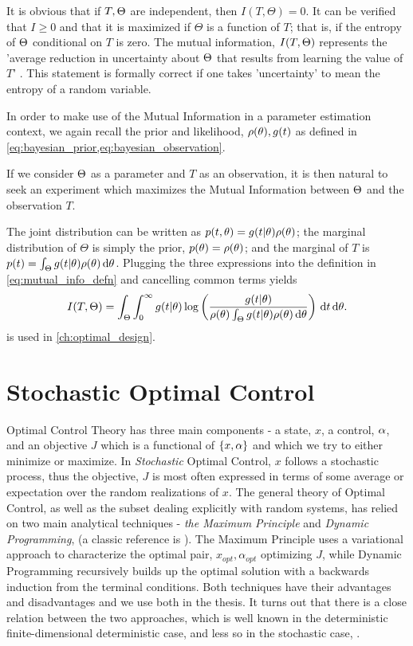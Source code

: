 It is obvious that if $T,{\Theta}$ are independent, then $I(T,\Theta) = 0$. It can
be verified that $I\geq0$ and that it is maximized if $\Theta$ is a function of
$T$; that is, if the entropy of ${\Theta}$ conditional on $T$ is zero. 
The mutual information, $I(T,{\Theta})$ represents the 'average
reduction in uncertainty about ${\Theta}$ that results from learning the value of
$T$' \cite{MacKay2003}. This statement is formally correct if one takes
 'uncertainty' to mean the entropy of a random
 variable.
 
In order to make use of the Mutual Information in a parameter estimation
context, we again recall the prior and likelihood, $\rho({ \theta}), g(t)$ as defined
in \cref{eq:bayesian_prior,eq:bayesian_observation}.

If we consider ${\Theta}$ as a parameter and $T$ as an observation, it is then
natural to seek an experiment which maximizes the Mutual Information between
${\Theta}$ and the observation $T$.
 
 The joint distribution can be written as $p(t,{ \theta}) =
g(t|{ \theta})\rho({ \theta})$; the marginal distribution of $\Theta$ is simply the prior, $p({ \theta}) =
\rho({ \theta})$; and the marginal of $T$ is $p(t) =
\int_\Theta g(t|{ \theta})\rho({ \theta}) \, \mathrm{d} { \theta}$.
Plugging the three expressions into the definition in
\cref{eq:mutual_info_defn} and cancelling common terms yields
\begin{equation}
I(T,{\Theta}) = \int_\Theta \int_0^{\infty} g(t|{ \theta}) 
\log \left( \frac{g(t|{ \theta}) }{\rho({ \theta})\int_\Theta g(t|{ \theta})\rho({ \theta}) \, \mathrm{d} { \theta}
 } \right)
\, \mathrm{d} t\, \mathrm{d} { \theta}.
\label{eq:mutual_info_prior_trajectory}
\end{equation}
  is used in
\cref{ch:optimal_design}.


\section{Stochastic Optimal Control}
Optimal Control Theory has three main components - a state, $x$, a control,
$\alpha$, and an objective $J$ which is a functional of $\{x,\alpha\}$ and which we try
to either minimize or maximize. In {\sl Stochastic} Optimal Control, $x$ follows
a stochastic process, thus the objective, $J$ is most often expressed in terms
of some average or expectation over the random realizations of $x$. The general
theory of Optimal Control, as well as the subset dealing explicitly with random
systems, has relied on two main analytical techniques - {\sl the Maximum
Principle} and {\sl Dynamic Programming}, (a classic reference is
\cite{Fleming1975}). The Maximum Principle uses a variational approach to
characterize the optimal pair, $x_{opt}, \alpha_{opt}$ optimizing $J$, while Dynamic Programming recursively builds up
the optimal solution with a backwards induction from the terminal conditions.
Both techniques have their advantages and disadvantages and we use both in the
thesis. It turns out that there is a close relation between the two approaches,
which is well known in the deterministic finite-dimensional deterministic case,
\cite{Fleming1975,Evansb} and less so in the stochastic case,
\cite{Annunziato2014}.

